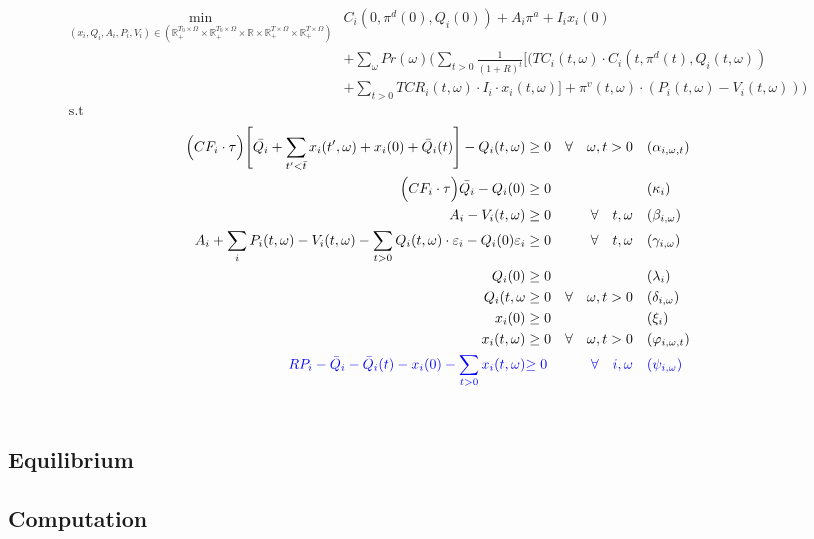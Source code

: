 \documentclass[11pt, letterpaper]{article}
\begin{document}
\begin{align}
\min_{(x_i,Q_i,A_i,P_i,V_i)\in (\mathbb{R}_+^{T_0\times\Omega} \times\mathbb{R}_+^{T_0\times\Omega} \times \mathbb{R}\times\mathbb{R}_+^{T\times\Omega}\times\mathbb{R}_+^{T\times\Omega})} &  C_i(0, \pi^d(0),Q_i(0))+ A_i \pi^{a} + I_i x_i(0) \nonumber \\ &+\sum_{\omega} Pr(\omega)   \Bigg( \sum_{t>0} \frac{1}{(1+R)^t} \Big[ (TC_i(t,\omega)\cdot C_i(t,\pi^d(t),Q_i(t,\omega) )  \nonumber \\
 & + \sum_{t > 0} TCR_i(t,\omega) \cdot I_i\cdot x_i(t,\omega) \Big] + \pi^v(t,\omega)\cdot \left(P_i(t,\omega)-V_i(t,\omega)\right) \Bigg)  \label{prodFO} \\
     \textrm{s.t \ } \nonumber
\end{align}
\begin{align}
    \Big(CF_i \cdot\tau\Big)  \Bigg[\bar{Q_i} + \sum_{t^{\prime}<\bar{t}} x_i(t^\prime,\omega) + x_i(0)+ \bar{Q}_i(t) \Bigg] - Q_i(t,\omega) & \geq 0  & \forall  \quad \omega, t  > 0 & \quad (\alpha_{i,\omega,t}) \\
    \Big(CF_i\cdot\tau \Big)\bar{Q_i}-Q_{i}(0) & \geq 0  &  \quad & \quad (\kappa_i) \\
 A_{i} -V_i(t,\omega) & \geq  0  & \forall  \quad t,\omega & \quad (\beta_{i,\omega})\\
 A_{i} + \sum_{i}P_i(t,\omega) - V_i(t,\omega)-\sum_{t>0}Q_i(t, \omega)\cdot \varepsilon_{i}-Q_i(0)\varepsilon_{i} & \geq  0  &\forall \quad t,\omega & \quad (\gamma_{i,\omega})\\
 Q_i(0) & \geq  0 & \quad & \quad (\lambda_i)\\
 Q_i(t, \omega & \geq  0   & \forall  \quad \omega, t >0 & \quad (\delta_{i,\omega})\\
  x_i(0) & \geq  0 & \quad & \quad (\xi_i)\\
  x_i(t, \omega) & \geq  0   & \forall  \quad \omega, t >0 & \quad (\varphi_{i,\omega,t})\\
{\color{blue} RP_i - \bar{Q}_i - \bar{Q}_i(t) - x_i(0) - \sum_{t > 0} x_i(t,\omega) } & {\color{blue} \geq 0} & {\color{blue} \forall \quad i,\omega }&  {\color{blue} \quad (\psi_{i,\omega}) }
  \end{align}\\

\subsection{Equilibrium}


\subsection{Computation}
\end{document}
